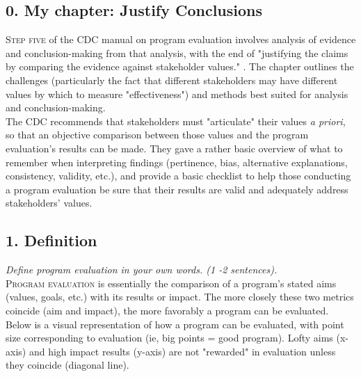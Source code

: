 \documentclass[11pt]{article}
\begin{document}
\begin{multicols}{2} 

\subsection*{0. My chapter: Justify Conclusions}
\lettrine[nindent=0em,lines=3]{S}{tep five} of the CDC manual on program evaluation involves analysis of evidence and conclusion-making from that analysis, with the end of "justifying the claims by comparing the evidence against stakeholder values." \cite{cdc}. The chapter outlines the challenges (particularly the fact that different stakeholders may have different values by which to measure "effectiveness") and methods best suited for analysis and conclusion-making. \\

The CDC recommends that stakeholders must "articulate" their values \emph{a priori}, so that an objective comparison between those values and the program evaluation's results can be made.  They gave a rather basic overview of what to remember when interpreting findings (pertinence, bias, alternative explanations, consistency, validity, etc.), and provide a basic checklist to help those conducting a program evaluation be sure that their results are valid and adequately address stakeholders' values.

\subsection*{1. Definition}
\emph{Define program evaluation in your own words. (1 -2 sentences).}\\

\lettrine[nindent=0em,lines=3]{P}{rogram evaluation} is essentially the comparison of a program's stated aims (values, goals, etc.) with its results or impact.  The more closely these two metrics coincide (aim and impact), the more favorably a program can be evaluated. \\

Below is a visual representation of how a program can be evaluated, with point size corresponding to evaluation (ie, big points = good program).  Lofty aims (x-axis) and high impact results (y-axis) are not "rewarded" in evaluation unless they coincide (diagonal line).


\end{multicols}
\end{document}
